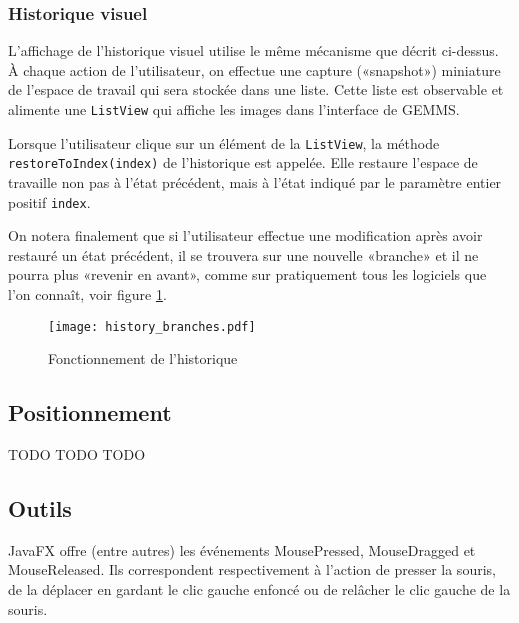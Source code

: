 \subsubsection{Historique visuel}
L'affichage de l'historique visuel utilise le même mécanisme que décrit ci-dessus. À chaque action de l'utilisateur, on effectue une capture («snapshot») miniature de l'espace de travail qui sera stockée dans une liste. Cette liste est observable et alimente une \texttt{ListView} qui affiche les images dans l'interface de GEMMS.

Lorsque l'utilisateur clique sur un élément de la \texttt{ListView}, la méthode \texttt{restoreToIndex(index)} de l'historique est appelée. Elle restaure l'espace de travaille non pas à l'état précédent, mais à l'état indiqué par le paramètre entier positif \texttt{index}.

On notera finalement que si l'utilisateur effectue une modification après avoir restauré un état précédent, il se trouvera sur une nouvelle «branche» et il ne pourra plus «revenir en avant», comme sur pratiquement tous les logiciels que l'on connaît, voir figure \ref{fig:hist_branches}.

\begin{figure}[h]
    \caption{Fonctionnement de l'historique}
    \centering
    \texttt{[image: history\_branches.pdf]}
    \label{fig:hist_branches}
\end{figure}

\subsection{Positionnement}
TODO TODO TODO

\subsection{Outils}
\par
JavaFX offre (entre autres) les événements MousePressed, MouseDragged et MouseReleased. Ils correspondent respectivement à l'action de presser la souris, de la déplacer en gardant le clic gauche enfoncé ou de relâcher le clic gauche de la souris.
